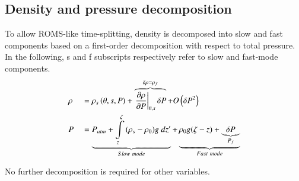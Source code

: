 \documentclass[a4paper,12pt]{article}
\begin{document}
 \subsection{Density and pressure decomposition}
\indent To allow ROMS-like time-splitting, density is decomposed into slow and fast components based on a first-order decomposition with respect to total pressure. In the following, s and f subscripts respectively refer to slow and fast-mode components.\\
\begin{alignat}{2}
  \displaystyle
  &\rho &&=\rho_{s}\left(\theta,s,P\right)
  +\overbrace{\left.{\frac{\partial{\rho}}{\partial{P}}}\right|_{\theta,s}\delta{P}}^{\delta{\rho}=\rho_{f}}
  +O\left(\delta{P}^2\right)\\
  &P &&=\underbrace{P_{atm}
  +\int\limits_z^{\zeta}{(\rho_{s}-\rho_0)g\ dz'}}_{Slow\ mode}
  +\underbrace{\rho_{0}g(\zeta-z)+\underbrace{\delta P}_{P_{f}}}_{Fast\ mode}
\end{alignat}
  
No further decomposition is required for other variables.
  
 
\end{document}

